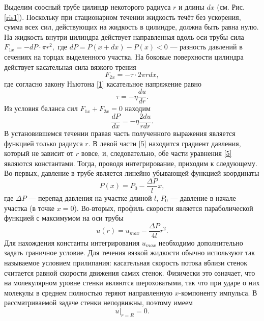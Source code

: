 \documentclass[a4paper, 12pt]{article}
\begin{document}
\par Выделим соосный трубе цилиндр некоторого радиуса $r$ и длины $dx$ (см.
Рис. \ref{ris1}). Поскольку при стационарном течении жидкость течёт без ускорения,
сумма всех сил, действующих на жидкость в цилиндре, должна быть равна
нулю. На жидкость внутри цилиндра действует направленная вдоль оси трубы
сила $F_{1x} = -dP \cdot \pi{r^2},$
где $dP = P(x + dx) - P(x) < 0$ — разность давлений в сечениях на торцах
выделенного участка. На боковые поверхности цилиндра действует касательная сила вязкого трения
\begin{equation}\label{3}
F_{2x} = -\tau \cdot 2\pi{rdx},
\end{equation}
где согласно закону Ньютона \eqref{1} касательное напряжение равно
\begin{equation}\label{4}
\tau = -\eta\frac{du}{dr}.
\end{equation}
Из условия баланса сил $F_{1x} + F_{2x} = 0$ находим
\begin{equation}\label{5}
\frac{dP}{dx} = -\eta\frac{2du}{rdr}.
\end{equation}
В установившемся течении правая часть полученного выражения является
функцией только радиуса $r$. В левой части \eqref{5} находится градиент давления,
который не зависит от $r$ вовсе, и, следовательно, обе части уравнения \eqref{5} являются константами. Тогда, проводя интегрирование, приходим к следующему. Во-первых, давление в трубе является линейно убывающей функцией
координаты
\begin{equation}\label{6}
P(x) = P_0 - \frac{\Delta{P}}{l}x,
\end{equation}
где $\Delta{P}$ — перепад давления на участке длиной $l$, $P_0$ — давление в начале
участка (в точке $x = 0$). Во-вторых, профиль скорости является параболической функцией с максимумом на оси трубы
\begin{equation}\label{7}
u(r) = u_{max} - \frac{\Delta{P}}{4l}r^2.
\end{equation}
Для нахождения константы интегрирования $u_{max}$ необходимо дополнительно задать граничное условие. Для течения вязкой жидкости обычно используют так называемое условием прилипания: касательная скорость потока вблизи стенок считается равной скорости движения самих стенок. Физически
это означает, что на молекулярном уровне стенки являются шероховатыми,
так что при ударе о них молекулы в среднем полностью теряют направленную
$x$-компоненту импульса. В рассматриваемой задаче стенки неподвижны, поэтому имеем
\begin{equation}\label{8}
u|_{r=R} = 0.
\end{equation}
\end{document}
